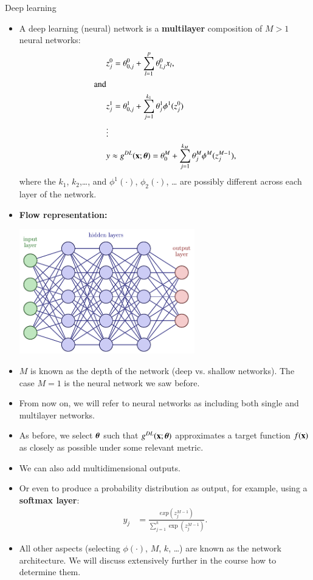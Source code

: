 \documentclass[notes, ignorenonframetext, compress, 10pt, xcolor=svgnames, aspectratio=169]{beamer}
\begin{document}
\begin{frame}[allowframebreaks]{Deep learning}
  \begin{itemize}
\item A deep learning (neural) network is a \textbf{multilayer} composition of $M > 1$ neural networks:
\begin{align*}
  &z_j^0 = \theta_{0, j}^0 + \sum_{l=1}^p\theta_{l, j}^0 x_l,\\
  \text{and}&\\
  &z_j^1 = \theta_{0, j}^1 + \sum_{j=1}^{k_1}\theta_j^1\phi^1(z_j^0)\\
  &\vdots\\
  & y \approx g^{DL}({\mathbf x}; {\boldsymbol \theta}) = \theta_0^M + \sum_{j = 1}^{k_M}\theta_j^M\phi^M(z_j^{M-1}),
  \end{align*}
  where the $k_1$, $k_2$,\ldots,  and $\phi^1(\cdot)$, $\phi_2(\cdot)$, \ldots
   are possibly different across each layer of the network.
  

  \framebreak 
  \item \textbf{Flow representation:}
  \begin{center}
    \includegraphics[width=0.6\textwidth]{../../Ressources/Figs/Fig_multilayerNet_2.pdf}\\
   \end{center}

   \framebreak

   \item $M$ is known as the depth of the network (deep vs. shallow networks). 
   The case $M = 1$ is the neural network we saw before.
\item From now on, we will refer to neural networks as including both single and multilayer networks.
\item As before, we select ${\boldsymbol \theta}$ such that $g^{DL}({\mathbf x}; {\boldsymbol \theta})$
 approximates a target function $f({\mathbf x})$ as closely as possible under some relevant metric.
\item We can also add multidimensional outputs.
\item Or even to produce a probability distribution as output, 
for example, using a \textbf{softmax layer}:
\begin{align*}
y_j &= \frac{exp(z_j^{M-1})}{\sum_{j=1}^k \exp(z_j^{M-1})}.
\end{align*}
\item All other aspects (selecting $\phi(\cdot)$, $M$, $k$, \ldots) 
are known as the network architecture. We will discuss extensively 
further in the course how to determine them.
\end{itemize}
\end{frame}
\end{document}
